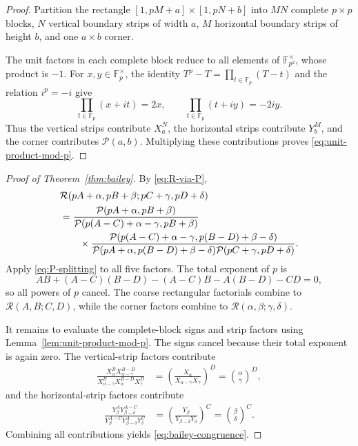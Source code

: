 \documentclass[a4paper,american,11pt]{amsart}
\numberwithin{equation}{section}
\theoremstyle{definition}
\newcommand{\F}{\mathbb F}
\newcommand{\Rect}{\mathcal R}
\newcommand{\Prect}{\mathcal P}
\begin{document}
\begin{proof}
Partition the rectangle $[1,pM+a]\times[1,pN+b]$ into $MN$ complete $p\times p$ blocks, $N$ vertical boundary strips of width $a$, $M$ horizontal boundary strips of height $b$, and one $a\times b$ corner.

The unit factors in each complete block reduce to all elements of $\F_{p^2}^{\times}$, whose product is $-1$. For $x,y\in\F_p^{\times}$, the identity $T^p-T=\prod_{t\in\F_p}(T-t)$ and the relation $i^p=-i$ give
\begin{equation}\label{eq:strip-products}
\prod_{t\in\F_p}(x+it)=2x,
\qquad
\prod_{t\in\F_p}(t+iy)=-2iy.
\end{equation}
Thus the vertical strips contribute $X_a^N$, the horizontal strips contribute $Y_b^M$, and the corner contributes $\Prect(a,b)$. Multiplying these contributions proves \eqref{eq:unit-product-mod-p}.
\end{proof}

\begin{proof}[Proof of Theorem~\ref{thm:bailey}]
By \eqref{eq:R-via-P},
\begin{align}\label{eq:bailey-five-P}
&\Rect(pA+\alpha,pB+\beta;pC+\gamma,pD+\delta)\notag\\
&=
\frac{\Prect(pA+\alpha,pB+\beta)}
{\Prect(p(A-C)+\alpha-\gamma,pB+\beta)}\notag\\
&\qquad\times
\frac{\Prect(p(A-C)+\alpha-\gamma,p(B-D)+\beta-\delta)}
{\Prect(pA+\alpha,p(B-D)+\beta-\delta)\Prect(pC+\gamma,pD+\delta)}.
\end{align}
Apply \eqref{eq:P-splitting} to all five factors. The total exponent of $p$ is
\[
AB+(A-C)(B-D)-(A-C)B-A(B-D)-CD=0,
\]
so all powers of $p$ cancel. The coarse rectangular factorials combine to $\Rect(A,B;C,D)$, while the corner factors combine to $\Rect(\alpha,\beta;\gamma,\delta)$.

It remains to evaluate the complete-block signs and strip factors using Lemma~\ref{lem:unit-product-mod-p}. The signs cancel because their total exponent is again zero. The vertical-strip factors contribute
\begin{align*}
\frac{X_\alpha^B X_{\alpha-\gamma}^{B-D}}
{X_{\alpha-\gamma}^{B}X_\alpha^{B-D}X_\gamma^D}
&=
\left(\frac{X_\alpha}{X_{\alpha-\gamma}X_\gamma}\right)^D
=
\binom{\alpha}{\gamma}^{D},
\end{align*}
and the horizontal-strip factors contribute
\begin{align*}
\frac{Y_\beta^A Y_{\beta-\delta}^{A-C}}
{Y_\beta^{A-C}Y_{\beta-\delta}^{A}Y_\delta^C}
&=
\left(\frac{Y_\beta}{Y_{\beta-\delta}Y_\delta}\right)^C
=
\binom{\beta}{\delta}^{C}.
\end{align*}
Combining all contributions yields \eqref{eq:bailey-congruence}.
\end{proof}
\end{document}
